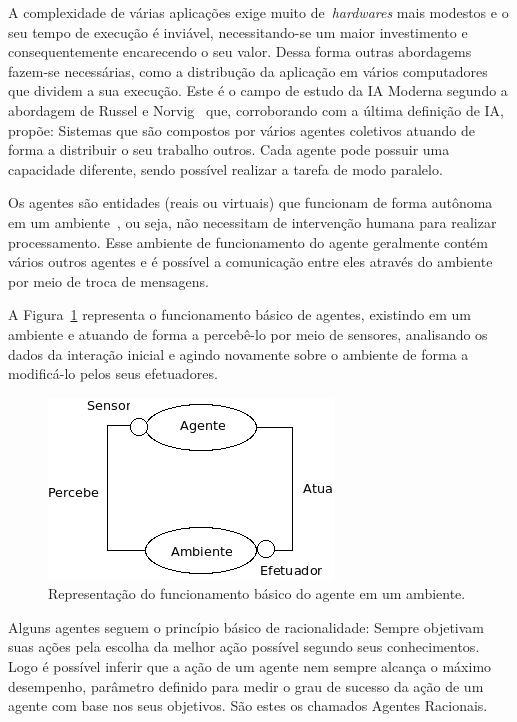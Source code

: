 A complexidade de várias aplicações exige muito de~\emph{hardwares} mais modestos e o seu tempo de execução é inviável, necessitando-se um maior investimento e consequentemente encarecendo o seu valor. Dessa forma outras abordagems fazem-se necessárias, como a distribução da aplicação em vários computadores que dividem a sua execução. Este é o campo de estudo da IA Moderna segundo a abordagem de Russel e Norvig~\cite{novig95} que, corroborando com a última definição de IA, propõe: Sistemas que são compostos por vários agentes coletivos atuando de forma a distribuir o seu trabalho outros. Cada agente pode possuir uma capacidade diferente, sendo possível realizar a tarefa de modo paralelo. 

Os agentes são entidades (reais ou virtuais) que funcionam de forma autônoma em um ambiente~\cite{novig95}, ou seja, não necessitam de intervenção humana para realizar processamento. Esse ambiente de funcionamento do agente geralmente contém vários outros agentes e é possível a comunicação entre eles através do ambiente por meio de troca de mensagens.

A Figura~\ref{fig:agente-basico} representa o funcionamento básico de agentes, existindo em um ambiente e atuando de forma a percebê-lo por meio de sensores, analisando os dados da interação inicial e agindo novamente sobre o ambiente de forma a modificá-lo pelos seus efetuadores.

\begin{figure}
	\centering
	\includegraphics[scale=0.75]{images/agente-basico.png}
	\caption{Representação do funcionamento básico do agente em um ambiente.}
	\label{fig:agente-basico}
\end{figure}

Alguns agentes seguem o princípio básico de racionalidade: Sempre objetivam suas ações pela escolha da melhor ação possível segundo seus conhecimentos. Logo é possível inferir que a ação de um agente nem sempre alcança o máximo desempenho, parâmetro definido para medir o grau de sucesso da ação de um agente com base nos seus objetivos. São estes os chamados Agentes Racionais.

